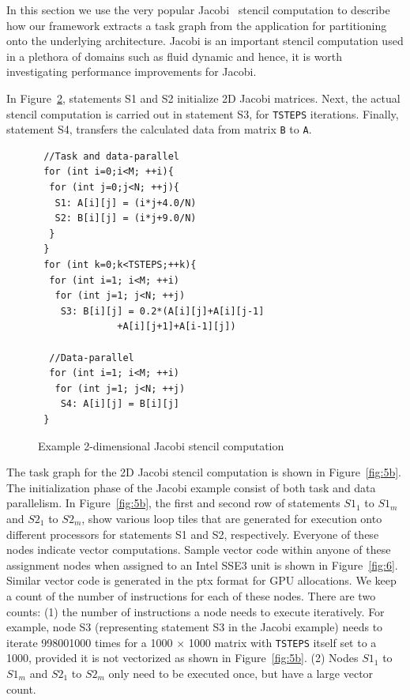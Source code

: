 \begin{figure}[t!]
{    \label{fig:5a}
  }
  \caption{}
  \label{fig:5}
\end{figure}

In this section we use the very popular Jacobi~\cite{jacobi2} stencil
computation to describe how our framework extracts a task graph from the
application for partitioning onto the underlying architecture. Jacobi is
an important stencil computation used in a plethora of domains such as
fluid dynamic and hence, it is worth investigating performance
improvements for Jacobi.

In Figure~\ref{fig:4}, statements S1 and S2 initialize 2D Jacobi
matrices. Next, the actual stencil computation is carried out in
statement S3, for \texttt{TSTEPS} iterations. Finally, statement S4,
transfers the calculated data from matrix \texttt{B} to \texttt{A}.

\begin{scriptsize}
  \begin{figure}[h!]
    \centering
\begin{verbatim}
 //Task and data-parallel
 for (int i=0;i<M; ++i){
  for (int j=0;j<N; ++j){
   S1: A[i][j] = (i*j+4.0/N)
   S2: B[i][j] = (i*j+9.0/N)
  }
 }
 for (int k=0;k<TSTEPS;++k){
  for (int i=1; i<M; ++i)
   for (int j=1; j<N; ++j)
    S3: B[i][j] = 0.2*(A[i][j]+A[i][j-1]
              +A[i][j+1]+A[i-1][j])

  //Data-parallel
  for (int i=1; i<M; ++i)
   for (int j=1; j<N; ++j)
    S4: A[i][j] = B[i][j]
 }
\end{verbatim}
    \caption{Example 2-dimensional Jacobi stencil computation}
    \label{fig:4}
  \end{figure}
\end{scriptsize}

The task graph for the 2D Jacobi stencil computation is shown in
Figure~\ref{fig:5b}. The initialization phase of the Jacobi example
consist of both task and data parallelism. In Figure~\ref{fig:5b}, the
first and second row of statements $S1_1$ to $S1_m$ and $S2_1$ to
$S2_m$, show various loop tiles that are generated for execution onto
different processors for statements S1 and S2, respectively. Everyone of
these nodes indicate vector computations. Sample vector code within
anyone of these assignment nodes when assigned to an Intel SSE3 unit is
shown in Figure~\ref{fig:6}. Similar vector code is generated in the ptx
format for GPU allocations. We keep a count of the number of
instructions for each of these nodes. There are two counts: (1) the
number of instructions a node needs to execute iteratively. For example,
node S3 (representing statement S3 in the Jacobi example) needs to
iterate 998001000 times for a 1000 $\times$ 1000 matrix with
\texttt{TSTEPS} itself set to a 1000, provided it is not vectorized as
shown in Figure~\ref{fig:5b}. (2) Nodes $S1_1$ to $S1_m$ and $S2_1$ to
$S2_m$ only need to be executed once, but have a large vector count.

